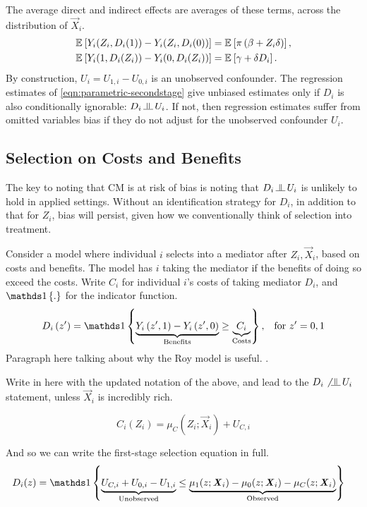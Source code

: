 The average direct and indirect effects are averages of these terms, across the distribution of $\vec X_i$.
\begin{align*}
    \mathbb{E}_{} \left[ Y_i(Z_i, D_i(1)) - Y_i(Z_i, D_i(0)) \right]
        &= \mathbb{E}_{} \left[ \pi \left( \beta +  Z_i \delta \right) \right], \\
    \mathbb{E}_{} \left[ Y_i(1, D_i(Z_i)) - Y_i(0, D_i(Z_i)) \right]
        &= \mathbb{E}_{} \left[ \gamma + \delta D_i \right].
\end{align*}
By construction, $U_i = U_{1, i} - U_{0, i}$ is an unobserved confounder.
The regression estimates of \autoref{eqn:parametric-secondstage} give unbiased estimates only if $D_i$ is also conditionally ignorable: $D_i \indep  U_i$.
If not, then regression estimates suffer from omitted variables bias if they do not adjust for the unobserved confounder $U_i$.

\subsection{Selection on Costs and Benefits}
The key to noting that CM is at risk of bias is noting that $D_i \indep  U_i$ is unlikely to hold in applied settings.
Without an identification strategy for $D_i$, in addition to that for $Z_i$, bias will persist, given how we conventionally think of selection into treatment.

Consider a model where individual $i$ selects into a mediator after $Z_i, \vec X_i$, based on costs and benefits.
The model has $i$ taking the mediator if the benefits of doing so exceed the costs.
Write $C_i$ for individual $i$'s costs of taking mediator $D_i$, and $\indicator{.}$ for the indicator function.
\[ D_i \left( z' \right) = \indicator{
    \underbrace{Y_i\left( z', 1 \right) - Y_i\left( z', 0 \right)}_{\text{Benefits}}
    \geq \underbrace{C_i}_{\text{Costs}}}, \;\;\; \text{for } z'=0,1\]
Paragraph here talking about why the Roy model is useful.
\citep{roy1951some,heckman1990empirical}.

Write in here with the updated notation of the above, and lead to the $D_i \not\indep U_i$ statement, unless $\vec X_i$ is incredibly rich.


\[ C_i(Z_i) = \mu_{C}(Z_i; \vec X_i) + U_{C,i} \]

And so we can write the first-stage selection equation in full.
\begin{align*}
    D_i(z) &= \indicator{
        \underbrace{U_{C, i} + U_{0, i} - U_{1, i}}_{\text{Unobserved}}
        \leq
        \underbrace{
            \mu_1(z; \vec X_i) - \mu_0(z; \vec X_i)- \mu_C(z; \vec X_i)}_{\text{Observed}}}
\end{align*}




